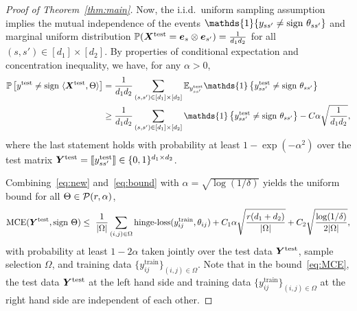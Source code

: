\documentclass[11pt]{article}
\theoremstyle{plain}
\theoremstyle{definition}
\def\sign{\textup{sign }}
\begin{document}
\begin{proof}[Proof of Theorem~\ref{thm:main}]
Now, the i.i.d.\ uniform sampling assumption implies the mutual independence of the events $\mathds{1}\{ y_{ss'}\neq \sign\theta_{ss'}\}$ and marginal uniform distribution $\mathbb{P}(\bm X^{\text{test}}=\bm{e}_s\otimes\bm{e}_{s'})={1\over d_1d_2}$ for all $(s,s')\in[d_1]\times[d_2]$. By properties of conditional expectation and concentration inequality, we have, for any $\alpha>0$,
\begin{align}\label{eq:bound}
\mathbb{P}\left[y^{\text{test}}\neq \sign\langle \mX^{\text{test}},\Theta\rangle\right]&={1\over d_1d_2} \sum_{(s,s')\in[d_1]\times[d_2]}\mathbb{E}_{y^{\text{test}}_{ss'}}\mathds{1}\left\{ y^{\text{test}}_{ss'}\neq \sign\theta_{ss'}\right\}\notag \\
&\geq {1\over d_1d_2}\sum_{(s,s')\in[d_1]\times[d_2]}\mathds{1}\left\{y^{\text{test}}_{ss'}\neq \sign\theta_{ss'}\right\} -  C\alpha \sqrt{1\over d_1d_2},
\end{align}
where the last statement holds with probability at least $1-\exp(-\alpha^2)$ over the test matrix $\bm Y^{\text{test}}=\llbracket y^{\text{test}}_{ss'} \rrbracket\in\{0,1\}^{d_1\times d_2}$. 

Combining~\eqref{eq:new} and~\eqref{eq:bound} with $\alpha=\sqrt{\log(1/\delta)}$ yields the uniform bound for all $\Theta\in\mathcal{P}(r,\alpha)$,
\begin{equation}\label{eq:MCE}
\textup{MCE}(\mY^{\textup{test}}, \sign \Theta) \leq \ {1\over |\Omega|}\sum_{(i,j)\in\Omega}\text{hinge-loss}(y^{\text{train}}_{ij}, \theta_{ij}) + C_1\alpha\sqrt{r(d_1+d_2)\over |\Omega|} + C_2\sqrt{\log(1/\delta)\over 2|\Omega|},
\end{equation}
with probability at least $1-2\alpha$ taken jointly over the test data $\bm Y^{\text{test}}$, sample selection $\Omega$, and training data $\{y^{\text{train}}_{ij}\}_{(i,j)\in\Omega}$. Note that in the bound~\eqref{eq:MCE}, the test data $\bm Y^{\text{test}}$ at the left hand side and training data $\{y^{\text{train}}_{ij}\}_{(i,j)\in\Omega}$ at the right hand side are independent of each other. 



\end{proof}
\end{document}

